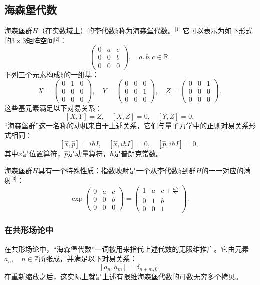 \subsection{海森堡代数}
海森堡群$H$（在实数域上）的李代数$\mathfrak{h}$称为海森堡代数。\(^\text{[1]}\)
它可以表示为如下形式的$3 \times 3$矩阵空间\(^\text{[2]}\)：
$$
\begin{pmatrix}
0 & a & c \\
0 & 0 & b \\
0 & 0 & 0
\end{pmatrix}, \quad a, b, c \in \mathbb{R}.~
$$
下列三个元素构成$\mathfrak{h}$的一组基：
$$
X = \begin{pmatrix}
0 & 1 & 0 \\
0 & 0 & 0 \\
0 & 0 & 0
\end{pmatrix}, \quad
Y = \begin{pmatrix}
0 & 0 & 0 \\
0 & 0 & 1 \\
0 & 0 & 0
\end{pmatrix}, \quad
Z = \begin{pmatrix}
0 & 0 & 1 \\
0 & 0 & 0 \\
0 & 0 & 0
\end{pmatrix}.~
$$
这些基元素满足以下对易关系：
$$
[X, Y] = Z, \quad [X, Z] = 0, \quad [Y, Z] = 0.~
$$
“海森堡群”这一名称的动机来自于上述关系，它们与量子力学中的正则对易关系形式相同：
$$
[\hat{x}, \hat{p}] = i \hbar I, \quad [\hat{x}, i \hbar I] = 0, \quad [\hat{p}, i \hbar I] = 0,~
$$
其中$\hat{x}$是位置算符，$\hat{p}$是动量算符，$\hbar$是普朗克常数。

海森堡群$H$具有一个特殊性质：指数映射是一个从李代数$\mathfrak{h}$到群$H$的一一对应的满射\(^\text{[3]}\)：
$$
\exp \begin{pmatrix}
0 & a & c \\
0 & 0 & b \\
0 & 0 & 0
\end{pmatrix}
=
\begin{pmatrix}
1 & a & c + \tfrac{ab}{2} \\
0 & 1 & b \\
0 & 0 & 1
\end{pmatrix}.~
$$
\subsubsection{在共形场论中}
在共形场论中，“海森堡代数”一词被用来指代上述代数的无限维推广。它由元素$a_{n}, \quad n \in \mathbb{Z}$所张成，并满足以下对易关系：
$$
[a_{n}, a_{m}] = \delta_{n+m,0}.~
$$
在重新缩放之后，这实际上就是上述有限维海森堡代数的可数无穷多个拷贝。
